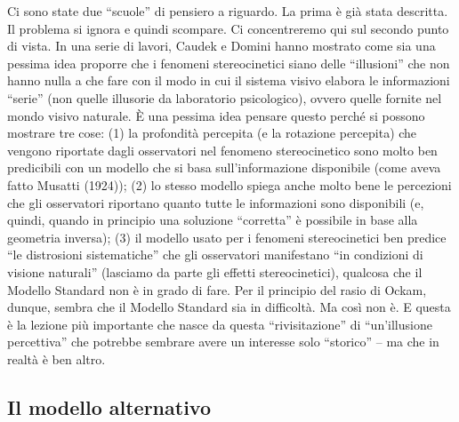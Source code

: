 \documentclass[
  man]{apa6}
\begin{document}
Ci sono state due ``scuole'' di pensiero a riguardo. La prima è già stata descritta. Il problema si ignora e quindi scompare. Ci concentreremo qui sul secondo punto di vista. In una serie di lavori, Caudek e Domini hanno mostrato come sia una pessima idea proporre che i fenomeni stereocinetici siano delle ``illusioni'' che non hanno nulla a che fare con il modo in cui il sistema visivo elabora le informazioni ``serie'' (non quelle illusorie da laboratorio psicologico), ovvero quelle fornite nel mondo visivo naturale. È una pessima idea pensare questo perché si possono mostrare tre cose: (1) la profondità percepita (e la rotazione percepita) che vengono riportate dagli osservatori nel fenomeno stereocinetico sono molto ben predicibili con un modello che si basa sull'informazione disponibile (come aveva fatto Musatti (1924)); (2) lo stesso modello spiega anche molto bene le percezioni che gli osservatori riportano quanto tutte le informazioni sono disponibili (e, quindi, quando in principio una soluzione ``corretta'' è possibile in base alla geometria inversa); (3) il modello usato per i fenomeni stereocinetici ben predice ``le distrosioni sistematiche'' che gli osservatori manifestano ``in condizioni di visione naturali'' (lasciamo da parte gli effetti stereocinetici), qualcosa che il Modello Standard non è in grado di fare. Per il principio del rasio di Ockam, dunque, sembra che il Modello Standard sia in difficoltà. Ma così non è. E questa è la lezione più importante che nasce da questa ``rivisitazione'' di ``un'illusione percettiva'' che potrebbe sembrare avere un interesse solo ``storico'' -- ma che in realtà è ben altro.

\subsection{Il modello alternativo}\label{il-modello-alternativo}
\end{document}
